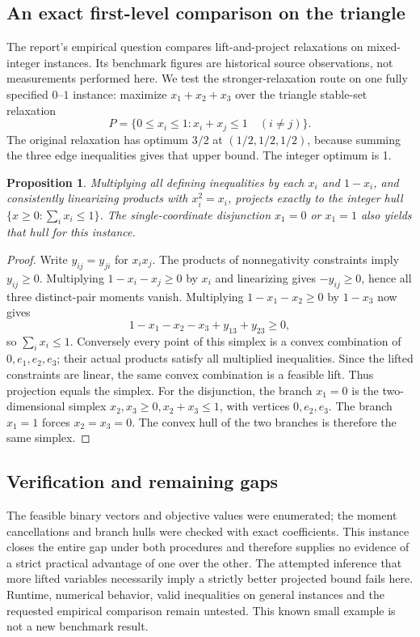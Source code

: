 \documentclass[11pt]{article}
\newtheorem{proposition}{Proposition}
\begin{document}
\subsection{An exact first-level comparison on the triangle}
The report's empirical question compares lift-and-project relaxations on mixed-integer instances. Its benchmark figures are historical source observations, not measurements performed here. We test the stronger-relaxation route on one fully specified $0$--$1$ instance: maximize $x_1+x_2+x_3$ over the triangle stable-set relaxation
\[
P=\{0\le x_i\le1:x_i+x_j\le1\quad(i\ne j)\}.
\]
The original relaxation has optimum $3/2$ at $(1/2,1/2,1/2)$, because summing the three edge inequalities gives that upper bound. The integer optimum is 1.
\begin{proposition}
Multiplying all defining inequalities by each $x_i$ and $1-x_i$, and consistently linearizing products with $x_i^2=x_i$, projects exactly to the integer hull $\{x\ge0:\sum_i x_i\le1\}$. The single-coordinate disjunction $x_1=0$ or $x_1=1$ also yields that hull for this instance.
\end{proposition}
\begin{proof}
Write $y_{ij}=y_{ji}$ for $x_ix_j$. The products of nonnegativity constraints imply $y_{ij}\ge0$. Multiplying $1-x_i-x_j\ge0$ by $x_i$ and linearizing gives $-y_{ij}\ge0$, hence all three distinct-pair moments vanish. Multiplying $1-x_1-x_2\ge0$ by $1-x_3$ now gives
\[
1-x_1-x_2-x_3+y_{13}+y_{23}\ge0,
\]
so $\sum_i x_i\le1$. Conversely every point of this simplex is a convex combination of $0,e_1,e_2,e_3$; their actual products satisfy all multiplied inequalities. Since the lifted constraints are linear, the same convex combination is a feasible lift. Thus projection equals the simplex.
For the disjunction, the branch $x_1=0$ is the two-dimensional simplex $x_2,x_3\ge0,x_2+x_3\le1$, with vertices $0,e_2,e_3$. The branch $x_1=1$ forces $x_2=x_3=0$. The convex hull of the two branches is therefore the same simplex.
\end{proof}
\subsection{Verification and remaining gaps}
The feasible binary vectors and objective values were enumerated; the moment cancellations and branch hulls were checked with exact coefficients. This instance closes the entire gap under both procedures and therefore supplies no evidence of a strict practical advantage of one over the other. The attempted inference that more lifted variables necessarily imply a strictly better projected bound fails here. Runtime, numerical behavior, valid inequalities on general instances and the requested empirical comparison remain untested. This known small example is not a new benchmark result.
\end{document}
